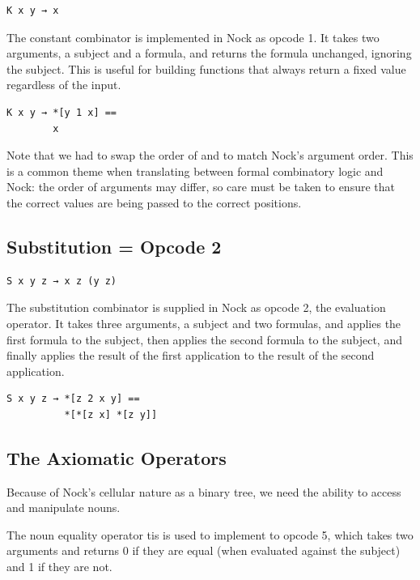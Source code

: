 \begin{lstlisting}[style=listingcomb,frame=tb]
K x y → x
\end{lstlisting}

The constant combinator  is implemented in Nock as opcode 1.  It takes two arguments, a subject and a formula, and returns the formula unchanged, ignoring the subject.  This is useful for building functions that always return a fixed value regardless of the input.

\begin{lstlisting}[style=listingcomb,frame=tb]
K x y → *[y 1 x] ==
        x
\end{lstlisting}

\noindent
Note that we had to swap the order of  and  to match Nock's argument order.  This is a common theme when translating between formal combinatory logic and Nock:  the order of arguments may differ, so care must be taken to ensure that the correct values are being passed to the correct positions.

\subsection{ Substitution = Opcode 2}

\begin{lstlisting}[style=listingcomb,frame=tb]
S x y z → x z (y z)
\end{lstlisting}

The substitution combinator  is supplied in Nock as opcode 2, the evaluation operator.  It takes three arguments, a subject and two formulas, and applies the first formula to the subject, then applies the second formula to the subject, and finally applies the result of the first application to the result of the second application.

\begin{lstlisting}[style=listingcomb,frame=tb]
S x y z → *[z 2 x y] ==
          *[*[z x] *[z y]]
\end{lstlisting}

\subsection{The Axiomatic Operators}

Because of Nock's cellular nature as a binary tree, we need the ability to access and manipulate nouns.

The noun equality operator \textct{=} tis is used to implement to opcode 5, which takes two arguments and returns 0 if they are equal (when evaluated against the subject) and 1 if they are not.

